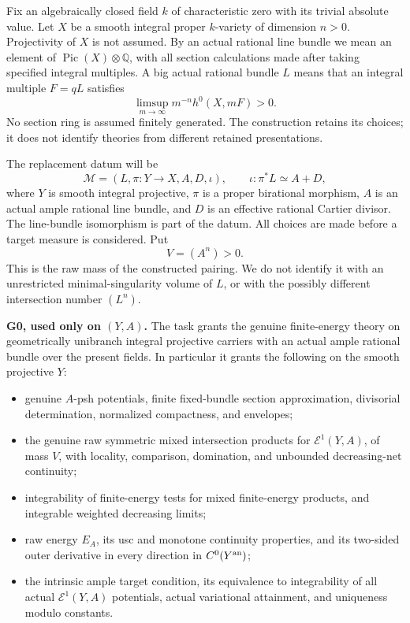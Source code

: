 \documentclass[
  10pt,
]{article}
\providecommand{\tightlist}{%
  \setlength{\itemsep}{0pt}\setlength{\parskip}{0pt}}
\begin{document}
Fix an algebraically closed field \(k\) of characteristic zero with its
trivial absolute value. Let \(X\) be a smooth integral proper
\(k\)-variety of dimension \(n>0\). Projectivity of \(X\) is not
assumed. By an actual rational line bundle we mean an element of
\(\operatorname{Pic}(X)\otimes\mathbb Q\), with all section calculations
made after taking specified integral multiples. A big actual rational
bundle \(L\) means that an integral multiple \(F=qL\) satisfies \[
\limsup_{m\longrightarrow\infty}m^{-n}h^0(X,mF)>0.
\] No section ring is assumed finitely generated. The construction
retains its choices; it does not identify theories from different
retained presentations.

The replacement datum will be \[
\mathcal M=(L,\pi:Y\longrightarrow X,A,D,\iota),\qquad
\iota:\pi^*L\simeq A+D,                                      \tag{1.1}
\] where \(Y\) is smooth integral projective, \(\pi\) is a proper
birational morphism, \(A\) is an actual ample rational line bundle, and
\(D\) is an effective rational Cartier divisor. The line-bundle
isomorphism is part of the datum. All choices are made before a target
measure is considered. Put \[V=(A^n)>0.\] This is the raw mass of the
constructed pairing. We do not identify it with an unrestricted
minimal-singularity volume of \(L\), or with the possibly different
intersection number \((L^n)\).

\textbf{G0, used only on \((Y,A)\).} The task grants the genuine
finite-energy theory on geometrically unibranch integral projective
carriers with an actual ample rational bundle over the present fields.
In particular it grants the following on the smooth projective \(Y\):

\begin{itemize}
\tightlist
\item
  genuine \(A\)-psh potentials, finite fixed-bundle section
  approximation, divisorial determination, normalized compactness, and
  envelopes;
\item
  the genuine raw symmetric mixed intersection products for
  \(\mathcal E^1(Y,A)\), of mass \(V\), with locality, comparison,
  domination, and unbounded decreasing-net continuity;
\item
  integrability of finite-energy tests for mixed finite-energy products,
  and integrable weighted decreasing limits;
\item
  raw energy \(E_A\), its usc and monotone continuity properties, and
  its two-sided outer derivative in every direction in
  \(C^0(Y^{\rm an})\);
\item
  the intrinsic ample target condition, its equivalence to integrability
  of all actual \(\mathcal E^1(Y,A)\) potentials, actual variational
  attainment, and uniqueness modulo constants.
\end{itemize}
\end{document}
